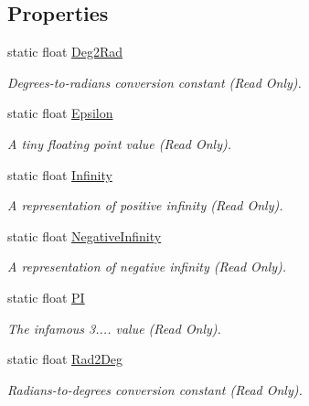 \subsection*{Properties}
\begin{DoxyCompactItemize}
\item 
static float \mbox{\hyperlink{class_lua_1_1_mathf_a5f003a3aab6299095b301066d0af6eab}{Deg2\+Rad}}
\begin{DoxyCompactList}\small\item\em Degrees-\/to-\/radians conversion constant (Read Only). \end{DoxyCompactList}\item 
static float \mbox{\hyperlink{class_lua_1_1_mathf_a121e67b35c4d96893e79a5be089ebc8a}{Epsilon}}
\begin{DoxyCompactList}\small\item\em A tiny floating point value (Read Only). \end{DoxyCompactList}\item 
static float \mbox{\hyperlink{class_lua_1_1_mathf_ac3686fdccff0df0a6c797af8ba4722b1}{Infinity}}
\begin{DoxyCompactList}\small\item\em A representation of positive infinity (Read Only). \end{DoxyCompactList}\item 
static float \mbox{\hyperlink{class_lua_1_1_mathf_a0f4a13d448b3d1a96f3aaff159d6636b}{Negative\+Infinity}}
\begin{DoxyCompactList}\small\item\em A representation of negative infinity (Read Only). \end{DoxyCompactList}\item 
static float \mbox{\hyperlink{class_lua_1_1_mathf_a408b4fa7c06dd48e2aa0d6fcde7adedc}{PI}}
\begin{DoxyCompactList}\small\item\em The infamous 3.... value (Read Only). \end{DoxyCompactList}\item 
static float \mbox{\hyperlink{class_lua_1_1_mathf_aed19ee907a834cbea518af347c4f39d7}{Rad2\+Deg}}
\begin{DoxyCompactList}\small\item\em Radians-\/to-\/degrees conversion constant (Read Only). \end{DoxyCompactList}\end{DoxyCompactItemize}


